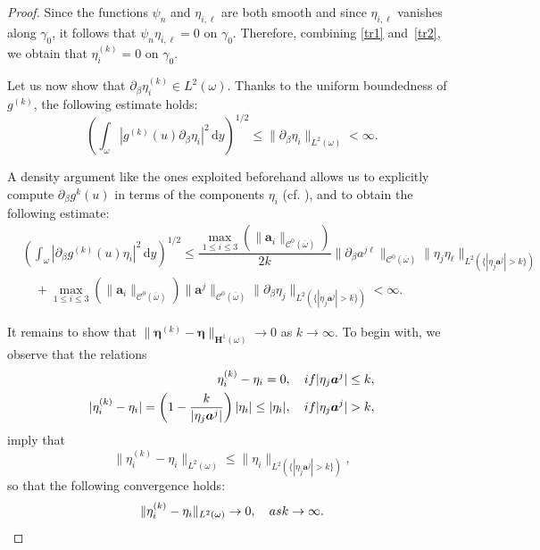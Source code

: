 \documentclass{amsart}
\def\dd{\, \mathrm{d}}
\begin{document}
\begin{proof}
	Since the functions $\psi_n$ and $\eta_{i,\ell}$ are both smooth and since $\eta_{i,\ell}$ vanishes along $\gamma_0$, it follows that $\psi_n \eta_{i,\ell} = 0$ on $\gamma_0$. Therefore, combining \eqref{tr1} and~\eqref{tr2}, we obtain that $\eta_i^{(k)}=0$ on $\gamma_0$.
	
	Let us now show that $\partial_\beta\eta_i^{(k)} \in L^2(\omega)$. Thanks to the uniform boundedness of $g^{(k)}$, the following estimate holds:
	\begin{equation*}
		\left(\int_{\omega}|g^{(k)}(u) \partial_\beta\eta_i|^2\dd y\right)^{1/2}\le \|\partial_\beta\eta_i\|_{L^2(\omega)}<\infty.
	\end{equation*}
	
	A density argument like the ones exploited beforehand allows us to explicitly compute $\partial_\beta g^{k}(u)$ in terms of the components $\eta_i$ (cf. \cite{CiaMarPie2018}), and to obtain the following estimate:
	\begin{equation*}
		\begin{aligned}
			&\left(\int_{\omega}|\partial_\beta g^{(k)}(u) \eta_i|^2\dd y\right)^{1/2}\le\dfrac{\max_{1\le i \le 3}\left(\|\bm{a}_i\|_{\bm{\mathcal{C}}^0(\overline{\omega})}\right)}{2k}\|\partial_\beta a^{j\ell}\|_{\mathcal{C}^0(\overline{\omega})}\|\eta_j\eta_\ell\|_{L^2(\{|\eta_j\bm{a}^j|>k\})}\\
		&\quad+\max_{1\le i \le 3}\left(\|\bm{a}_i\|_{\bm{\mathcal{C}}^0(\overline{\omega})}\right) \|\bm{a}^j\|_{\bm{\mathcal{C}}^0(\overline{\omega})}\|\partial_\beta \eta_j\|_{L^2(\{|\eta_j\bm{a}^j|>k\})}<\infty.
		\end{aligned}
	\end{equation*}
	
	It remains to show that $\|\bm{\eta}^{(k)}-\bm{\eta}\|_{\bm{H}^1(\omega)} \to 0$ as $k \to \infty$.
	To begin with, we observe that the relations
	\begin{equation*}
		\begin{aligned}
		\eta_i^{(k)} - \eta_i = 0&,\quad \textup{ if } |\eta_j \bm{a}^j| \le k ,\\
		|\eta_i^{(k)} - \eta_i| = \left(1-\frac{k}{|\eta_j \bm{a}^j|}\right) |\eta_i| \le |\eta_i|&,\quad \textup{ if }|\eta_j\bm{a}^j|>k,
		\end{aligned}
	\end{equation*}
	imply that
	\begin{equation*}
		\|\eta_i^{(k)}-\eta_i \|_{L^2(\omega)} \le \|\eta_i\|_{L^2(\{|\eta_j\bm{a}^j|>k\})},
	\end{equation*}
	so that the following convergence holds:
	\begin{equation*}
		\|\eta_i^{(k)}-\eta_i\|_{L^2(\omega)} \to 0,\quad \textup{ as } k \to \infty.
	\end{equation*}
	

\end{proof}
\end{document}
